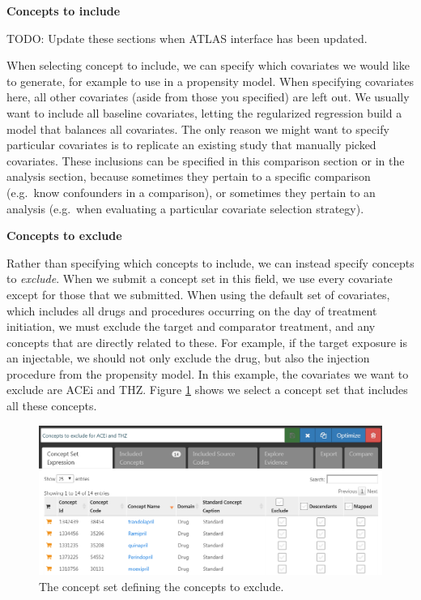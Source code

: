\documentclass[11pt]{book}
\begin{document}
\textbf{Concepts to include}

TODO: Update these sections when ATLAS interface has been updated.

When selecting concept to include, we can specify which covariates we
would like to generate, for example to use in a propensity model. When
specifying covariates here, all other covariates (aside from those you
specified) are left out. We usually want to include all baseline
covariates, letting the regularized regression build a model that
balances all covariates. The only reason we might want to specify
particular covariates is to replicate an existing study that manually
picked covariates. These inclusions can be specified in this comparison
section or in the analysis section, because sometimes they pertain to a
specific comparison (e.g.~know confounders in a comparison), or
sometimes they pertain to an analysis (e.g.~when evaluating a particular
covariate selection strategy).

\textbf{Concepts to exclude}

Rather than specifying which concepts to include, we can instead specify
concepts to \emph{exclude}. When we submit a concept set in this field,
we use every covariate except for those that we submitted. When using
the default set of covariates, which includes all drugs and procedures
occurring on the day of treatment initiation, we must exclude the target
and comparator treatment, and any concepts that are directly related to
these. For example, if the target exposure is an injectable, we should
not only exclude the drug, but also the injection procedure from the
propensity model. In this example, the covariates we want to exclude are
ACEi and THZ. Figure \ref{fig:covsToExclude} shows we select a concept
set that includes all these concepts.

\begin{figure}

{\centering \includegraphics[width=1\linewidth]{images/PopulationLevelEstimation/covsToExclude} 

}

\caption{The concept set defining the concepts to exclude.}\label{fig:covsToExclude}
\end{figure}
\end{document}
